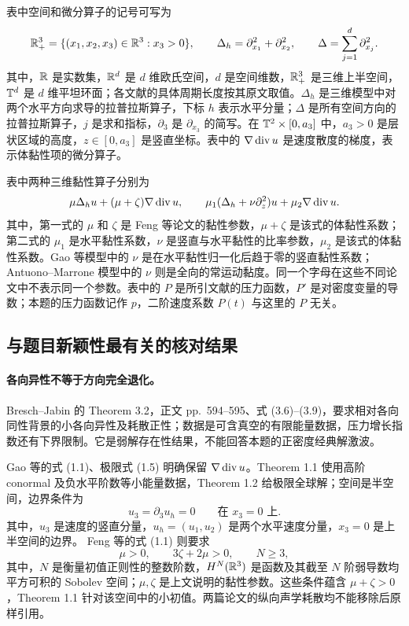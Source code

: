 表中空间和微分算子的记号可写为
\[
 \mathbb R^3_+=\{(x_1,x_2,x_3)\in\mathbb R^3:x_3>0\},\qquad
 \Delta_h=\partial_{x_1}^2+\partial_{x_2}^2,\qquad
 \Delta=\sum_{j=1}^{d}\partial_{x_j}^2.
\]
其中，$\mathbb R$ 是实数集，$\mathbb R^d$ 是 $d$ 维欧氏空间，$d$ 是空间维数，$\mathbb R^3_+$ 是三维上半空间，$\mathbb T^d$ 是 $d$ 维平坦环面；各文献的具体周期长度按其原文取值。$\Delta_h$ 是三维模型中对两个水平方向求导的拉普拉斯算子，下标 $h$ 表示水平分量；$\Delta$ 是所有空间方向的拉普拉斯算子，$j$ 是求和指标，$\partial_3$ 是 $\partial_{x_3}$ 的简写。在 $\mathbb T^2\times[0,a_3]$ 中，$a_3>0$ 是层状区域的高度，$z\in[0,a_3]$ 是竖直坐标。表中的 $\nabla\operatorname{div} u$ 是速度散度的梯度，表示体黏性项的微分算子。

表中两种三维黏性算子分别为
\[
 \mu\Delta_hu+(\mu+\zeta)\nabla\operatorname{div} u,\qquad
 \mu_1(\Delta_h+\nu\partial_z^2)u+\mu_2\nabla\operatorname{div} u.
\]
其中，第一式的 $\mu$ 和 $\zeta$ 是 Feng 等论文的黏性参数，$\mu+\zeta$ 是该式的体黏性系数；第二式的 $\mu_1$ 是水平黏性系数，$\nu$ 是竖直与水平黏性的比率参数，$\mu_2$ 是该式的体黏性系数。Gao 等模型中的 $\nu$ 是在水平黏性归一化后趋于零的竖直黏性系数；Antuono--Marrone 模型中的 $\nu$ 则是全向的常运动黏度。同一个字母在这些不同论文中不表示同一个参数。表中的 $P$ 是所引文献的压力函数，$P'$ 是对密度变量的导数；本题的压力函数记作 $p$，二阶速度系数 $P(t)$ 与这里的 $P$ 无关。

\subsection{与题目新颖性最有关的核对结果}
\paragraph{各向异性不等于方向完全退化。}
Bresch--Jabin 的 Theorem 3.2，正文 pp.~594--595、式 (3.6)--(3.9)，要求相对各向同性背景的小各向异性及耗散正性；数据是可含真空的有限能量数据，压力增长指数还有下界限制。它是弱解存在性结果，不能回答本题的正密度经典解激波。\cite{BJ}

Gao 等的式 (1.1)、极限式 (1.5) 明确保留 $\nabla\operatorname{div} u$。Theorem 1.1 使用高阶 conormal 及负水平阶数等小能量数据，Theorem 1.2 给极限全球解；空间是半空间，边界条件为
\[
 u_3=\partial_3u_h=0\qquad\text{在 }x_3=0\text{ 上}.
\]
其中，$u_3$ 是速度的竖直分量，$u_h=(u_1,u_2)$ 是两个水平速度分量，$x_3=0$ 是上半空间的边界。
Feng 等的式 (1.1) 则要求
\[
 \mu>0,\qquad 3\zeta+2\mu>0,\qquad N\ge3,
\]
其中，$N$ 是衡量初值正则性的整数阶数，$H^N(\mathbb R^3)$ 是函数及其截至 $N$ 阶弱导数均平方可积的 Sobolev 空间；$\mu,\zeta$ 是上文说明的黏性参数。这些条件蕴含 $\mu+\zeta>0$，Theorem 1.1 针对该空间中的小初值。两篇论文的纵向声学耗散均不能移除后原样引用。\cite{GPWY,FHWW}

